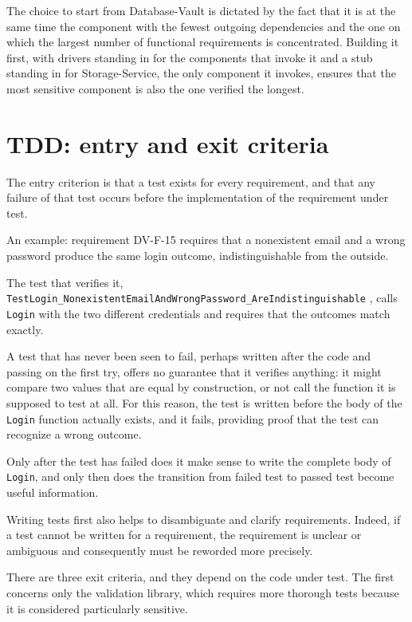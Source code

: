 The choice to start from Database-Vault is dictated by the fact that it is at the same time the component
with the fewest outgoing dependencies and the one on which the largest number of functional requirements is concentrated.
Building it first, with drivers standing in for the components that invoke it and a stub standing in for
Storage-Service, the only component it invokes, ensures that the most sensitive component is also the one verified the longest.


\section{TDD: entry and exit criteria}

The entry criterion is that a test exists for every requirement, and that any failure of that test
occurs before the implementation of the requirement under test.

An example: requirement DV-F-15 requires that a nonexistent email and a wrong password produce the
same login outcome, indistinguishable from the outside.

The test that verifies it, \texttt{TestLogin\_NonexistentEmailAndWrongPassword\_AreIndistinguishable}
\cite{ramusb-code-login-test-dv-f-15}, calls \texttt{Login} with the two different credentials and requires
that the outcomes match exactly.

A test that has never been seen to fail, perhaps written after the code and passing on the first try, offers no
guarantee that it verifies anything: it might compare two values that are equal by construction, or not call the
function it is supposed to test at all.
For this reason, the test is written before the body of the \texttt{Login} function actually exists, and
it fails, providing proof that the test can recognize a wrong outcome.

Only after the test has failed does it make sense to write the complete body of \texttt{Login}, and only then does the
transition from failed test to passed test become useful information.

Writing tests first also helps to disambiguate and clarify requirements. Indeed, if a test cannot be written for a
requirement, the requirement is unclear or ambiguous and
consequently must be reworded more precisely.

There are three exit criteria, and they depend on the code under test. The first concerns only the validation
library, which requires more thorough tests because it is considered particularly sensitive.

